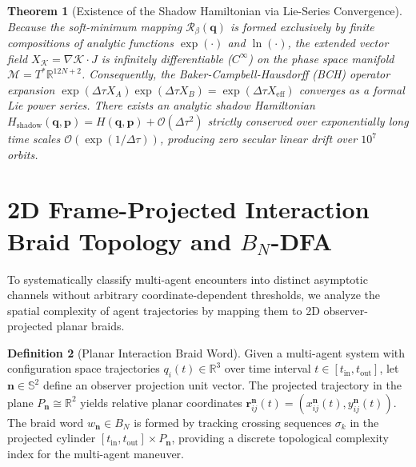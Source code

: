 \documentclass[11pt,a4paper,reqno]{article}
\theoremstyle{plain}
\newtheorem{theorem}{Theorem}[section]
\theoremstyle{definition}
\newtheorem{definition}[theorem]{Definition}
\theoremstyle{remark}
\numberwithin{equation}{section}
\begin{document}
\begin{theorem}[Existence of the Shadow Hamiltonian via Lie-Series Convergence]
\label{thm:bea_c_infinity}
Because the soft-minimum mapping $\mathcal{R}_\beta(\bm{q})$ is formed exclusively by finite compositions of analytic functions $\exp(\cdot)$ and $\ln(\cdot)$, the extended vector field $X_{\mathcal{K}} = \nabla \mathcal{K} \cdot J$ is infinitely differentiable ($C^\infty$) on the phase space manifold $\mathcal{M} = T^*\mathbb{R}^{12N+2}$. Consequently, the Baker-Campbell-Hausdorff (BCH) operator expansion $\exp(\Delta \tau X_A) \exp(\Delta \tau X_B) = \exp(\Delta \tau X_{\mathrm{eff}})$ converges as a formal Lie power series. There exists an analytic shadow Hamiltonian $H_{\mathrm{shadow}}(\bm{q}, \bm{p}) = H(\bm{q}, \bm{p}) + \mathcal{O}(\Delta \tau^2)$ strictly conserved over exponentially long time scales $\mathcal{O}(\exp(1/\Delta \tau))$, producing zero secular linear drift over $10^7$ orbits.
\end{theorem}

\bigskip

\section{2D Frame-Projected Interaction Braid Topology and \texorpdfstring{$B_N$}{BN}-DFA}

To systematically classify multi-agent encounters into distinct asymptotic channels without arbitrary coordinate-dependent thresholds, we analyze the spatial complexity of agent trajectories by mapping them to 2D observer-projected planar braids.

\begin{definition}[Planar Interaction Braid Word]
\label{def:planar_braid}
Given a multi-agent system with configuration space trajectories $q_i(t) \in \mathbb{R}^3$ over time interval $t \in [t_{\mathrm{in}}, t_{\mathrm{out}}]$, let $\mathbf{n} \in \mathbb{S}^2$ define an observer projection unit vector. The projected trajectory in the plane $P_{\mathbf{n}} \cong \mathbb{R}^2$ yields relative planar coordinates $\bm{r}_{ij}^{\mathbf{n}}(t) = (x_{ij}^{\mathbf{n}}(t), y_{ij}^{\mathbf{n}}(t))$. The braid word $w_{\mathbf{n}} \in B_N$ is formed by tracking crossing sequences $\sigma_k$ in the projected cylinder $[t_{\mathrm{in}}, t_{\mathrm{out}}] \times P_{\mathbf{n}}$, providing a discrete topological complexity index for the multi-agent maneuver.
\end{definition}
\end{document}
